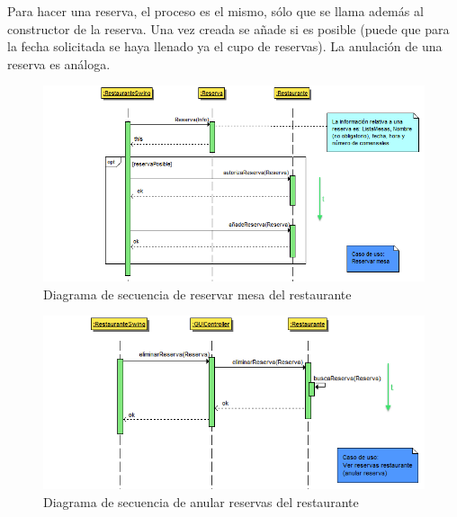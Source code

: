 \documentclass[spanish,a4paper,11pt, twoside]{report}	%
\begin{document}
		Para hacer una reserva, el proceso es el mismo, sólo que se llama además al constructor de la reserva. Una vez creada se añade si es posible (puede que para la fecha solicitada se haya llenado ya el cupo de reservas). La anulación de una reserva es análoga.
		\begin{figure}[!h]
		\centering
		\includegraphics[scale=0.5]{DSreservarmesa.png}
		\caption{Diagrama de secuencia de reservar mesa del restaurante}
		\end{figure}

		\begin{figure}[!h]
		\centering
		\includegraphics[scale=0.5]{DSanularreserva.png}
		\caption{Diagrama de secuencia de anular reservas del restaurante}
		\end{figure}

		
\end{document}
